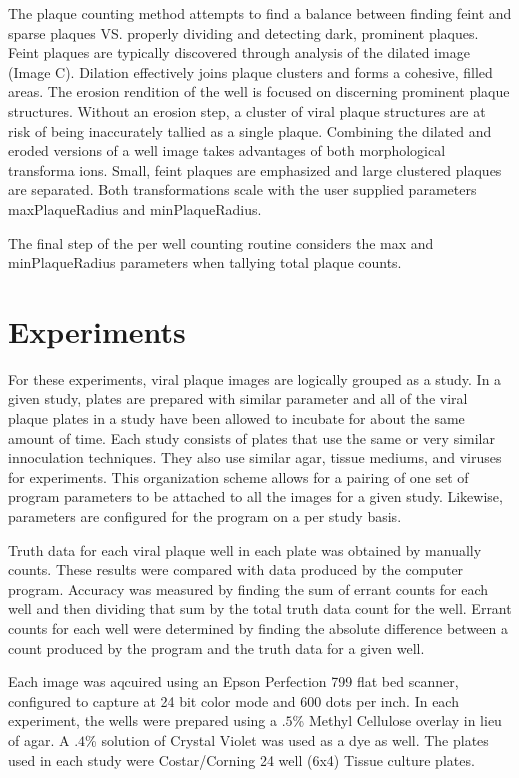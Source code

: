 \documentclass[11pt,final,twocolumn]{IEEEtran}
\begin{document}
The plaque counting method attempts to find a balance between finding feint and sparse plaques VS. properly dividing and detecting dark, prominent plaques. Feint  plaques are typically discovered through analysis of the dilated image (Image C). Dilation effectively joins plaque clusters and forms a cohesive, filled areas. The erosion rendition of the well is focused on discerning prominent plaque structures.  Without an erosion step, a cluster of viral plaque structures are at risk of being inaccurately tallied as a single plaque. Combining the dilated and eroded versions of a well image takes advantages of both morphological transforma ions. Small, feint plaques are emphasized and large  clustered plaques are separated. Both transformations scale with the user supplied parameters maxPlaqueRadius and minPlaqueRadius.

The final step of the per well counting routine considers the max and minPlaqueRadius parameters when tallying total plaque counts. 

\section{Experiments}\label{sec:experiments}

For these experiments, viral plaque images are logically grouped as a study. In a given study, plates are prepared with similar parameter and all of the viral plaque plates in a study have been allowed to incubate for about the same amount of time. Each study consists of plates that use the same or very similar innoculation techniques. They also use similar agar, tissue mediums, and viruses for experiments. This organization scheme allows for a pairing of one set of program parameters to be attached to all the images for a given study. Likewise, parameters are configured for the program on a per study 
basis.

Truth data for each viral plaque well in each plate was obtained by manually counts. These results were compared with data produced by the computer program. Accuracy was measured by finding the sum of errant counts for each well and then dividing that sum by the total truth data count for the well. Errant counts for each well were determined by finding the absolute difference between a count produced by the program and the truth data for a given well.

Each image was aqcuired using an Epson Perfection 799 flat bed scanner, configured to capture at 24 bit color mode and 600 dots per inch. In each experiment, the wells were prepared using a $.5$\%   Methyl Cellulose overlay in lieu of agar. A $.4$\% solution of Crystal Violet was used as a dye as well. 
The plates used in each study were Costar/Corning 24 well (6x4) Tissue culture plates. 
\end{document}
